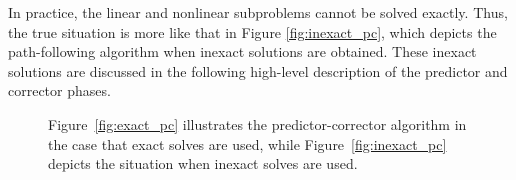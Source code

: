 In practice, the linear and nonlinear subproblems cannot be solved exactly.  Thus, the true situation is more like that in Figure \ref{fig:inexact_pc}, which depicts the path-following algorithm when inexact solutions are obtained.  These inexact solutions are discussed in the following high-level description of the predictor and corrector phases.  


\begin{figure}[tbp]
  \centering
  \hspace{3em} 
 \caption{ Figure~\ref{fig:exact_pc} illustrates the predictor-corrector algorithm in the case that exact solves are used, while Figure~\ref{fig:inexact_pc} depicts the situation when inexact solves are used. \label{fig:pc}}   
\end{figure}


